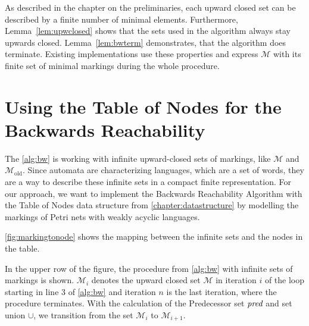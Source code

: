 As described in the chapter on the preliminaries, each upward closed set can be described by a finite number of minimal elements. Furthermore, Lemma~\autoref{lem:upwclosed} shows that the sets used in the algorithm always stay upwards closed. Lemma~\autoref{lem:bwterm} demonstrates, that the algorithm does terminate. Existing implementations use these properties and express $\mathcal{M}$ with its finite set of minimal markings during the whole procedure.




\section{Using the Table of Nodes for the Backwards Reachability}
The \autoref{alg:bw} is working with infinite upward-closed sets of markings, like $\mathcal{M}$ and $\mathcal{M}_{\text{old}}$. Since automata are characterizing languages, which are a set of words, they are a way to describe these infinite sets in a compact finite representation. For our approach, we want to implement the Backwards Reachability Algorithm with the Table of Nodes data structure from \autoref{chapter:datastructure} by modelling the markings of Petri nets with weakly acyclic languages. 

\par 

\autoref{fig:markingtonode} shows the mapping between the infinite sets and the nodes in the table. 
\par 

In the upper row of the figure, the procedure from \autoref{alg:bw} with infinite sets of markings is shown. 
$\mathcal{M}_{i}$ denotes the upward closed set $\mathcal{M}$ in iteration $i$ of the loop starting in line 3 of \autoref{alg:bw} and iteration $n$ is the last iteration, where the procedure terminates. With the calculation of the Predecessor set $\operatorname{\textit{pred}}$ and set union $\cup$, we transition from the set $\mathcal{M}_{i}$  to $\mathcal{M}_{i+1}$.


